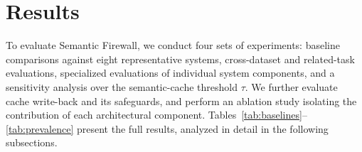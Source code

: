 \documentclass[runningheads]{llncs}
\newif\ifrev
\newcommand{\rev}[1]{\ifrev\hl{#1}\else#1\fi}                  %
\begin{document}
\section{Results}\label{sec:results}

To evaluate Semantic Firewall, we conduct four sets of experiments: baseline comparisons against \rev{eight} representative systems, \rev{cross-dataset and related-task evaluations}, specialized evaluations of individual system components, and a sensitivity analysis over the semantic-cache threshold 
$\tau$. We further \rev{evaluate cache write-back and its safeguards, and} perform an ablation study isolating the contribution of each architectural component. Tables~\ref{tab:baselines}\rev{--\ref{tab:prevalence}} present the full results, analyzed in detail in the following subsections.
\end{document}
